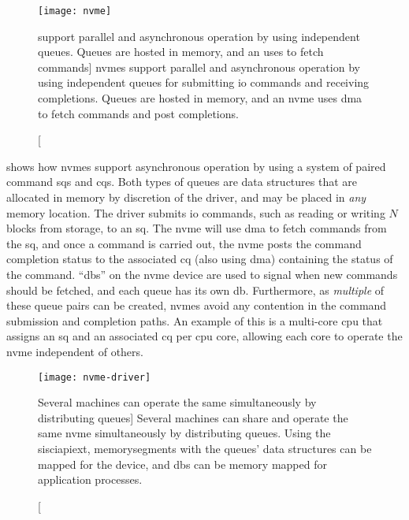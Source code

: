\begin{figure}
    \centering
    \texttt{[image: nvme]}
    \caption
    [ support parallel and asynchronous operation by using independent queues. Queues are hosted in memory, and an  uses  to fetch commands]
    {\Glspl{nvme} support parallel and asynchronous operation by using independent queues for submitting \gls{io} commands and receiving completions. Queues are hosted in memory, and an \gls{nvme} uses \gls{dma} to fetch commands and post completions.}
    \label{fig:nvme}
\end{figure}



 shows how \glspl{nvme} support asynchronous operation by using a system of paired command \glspl{sq} and \glspl{cq}.
%
Both types of queues are data structures that are allocated in memory by discretion of the driver, and may be placed in \emph{any} memory location.
%
The driver submits \gls{io} commands, such as reading or writing $N$ blocks from storage, to an \gls{sq}.
%
The \gls{nvme} will use \gls{dma} to fetch commands from the \gls{sq}, and once a command is carried out, the \gls{nvme} posts the command completion status to the associated \gls{cq} (also using \gls{dma}) containing the status of the command.
%
``\Glspl{db}'' on the \gls{nvme} device are used to signal when new commands should be fetched, and each queue has its own \gls{db}.
%
Furthermore, as \emph{multiple} of these queue pairs can be created, \glspl{nvme} avoid any contention in the command submission and completion paths.
%
An example of this is a multi-core \gls{cpu} that assigns an \gls{sq} and an associated \gls{cq} per \gls{cpu} core, allowing each core to operate the \gls{nvme} independent of others.


\begin{figure}
    \centering
    \texttt{[image: nvme-driver]}
    \caption
    [Several machines can operate the same  simultaneously by distributing queues]
    {Several machines can share and operate the same \gls{nvme} simultaneously by distributing queues. Using the \gls{sisciapiext}, \glspl{memorysegment} with the queues' data structures can be mapped for the device, and \glspl{db} can be memory mapped for application processes.}
    \label{fig:nvme-driver}
\end{figure}


